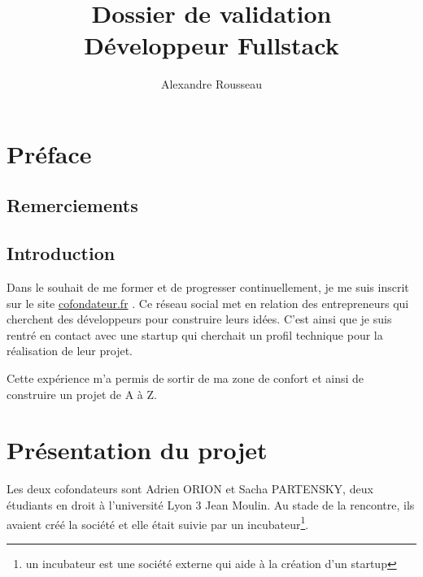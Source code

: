 \documentclass[]{report}
\title{\textbf{Dossier de validation}\\Développeur Fullstack}
\author{Alexandre Rousseau}
\begin{document}
\lstset{
  autogobble,%
  breaklines=true, %
  captionpos=b, %
  frame=single, %
  showtabs=false, %
  tabsize=2, %
}

\maketitle

\newpage

\tableofcontents
\newpage


\chapter{Préface}

  \section{Remerciements}


  \section{Introduction}

    Dans le souhait de me former et de progresser continuellement, je me suis inscrit sur le site  \href{https://cofondateur.fr}{cofondateur.fr} . Ce réseau social met en relation des entrepreneurs qui cherchent des développeurs pour construire leurs idées. C'est ainsi que je suis rentré en contact avec une startup qui cherchait un profil technique pour la réalisation de leur projet.

    Cette expérience  m'a permis de sortir de ma zone de confort et ainsi de construire un projet de A à Z.

\chapter{Présentation du projet}



  Les deux cofondateurs sont Adrien ORION et Sacha PARTENSKY, deux étudiants en droit à l’université Lyon 3 Jean Moulin. Au stade de la rencontre, ils avaient créé la société et elle était suivie par un incubateur\footnote{un incubateur est une société externe qui aide à la création d'un startup}.
\end{document}
